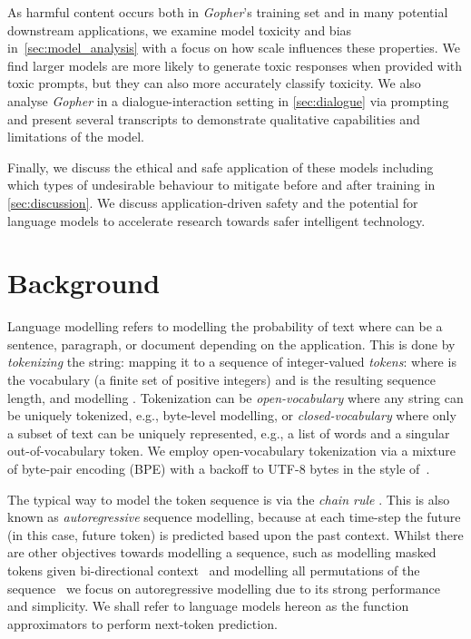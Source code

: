 \documentclass[11pt, a4paper, logo, internal, copyright, nonumbering]{deepmind}
\newcommand{\gopher}{\textit{Gopher}\xspace}
\begin{document}
As harmful content occurs both in \gopher's training set and in many potential downstream applications, we examine model toxicity and bias in~\autoref{sec:model_analysis} with a focus on how scale influences these properties. We find larger models are more likely to generate toxic responses when provided with toxic prompts, but they can also more accurately classify toxicity. 
We also analyse \gopher in a dialogue-interaction setting in \autoref{sec:dialogue} via prompting and present several transcripts to demonstrate qualitative capabilities and limitations of the model.


Finally, we discuss the ethical and safe application of these models including which types of undesirable behaviour to mitigate before and after training in \autoref{sec:discussion}. We discuss application-driven safety and the potential for language models to accelerate research towards safer intelligent technology.


\section{Background}
\label{background}
Language modelling refers to modelling the probability of text  where  can be a sentence, paragraph, or document depending on the application. This is done by \textit{tokenizing} the string: mapping it to a sequence of integer-valued \textit{tokens}:  where  is the vocabulary (a finite set of positive integers) and  is the resulting sequence length, and modelling . Tokenization can be \textit{open-vocabulary} where any string can be uniquely tokenized, e.g., byte-level modelling, or \textit{closed-vocabulary} where only a subset of text can be uniquely represented, e.g., a list of words and a singular out-of-vocabulary token. We employ open-vocabulary tokenization via a mixture of byte-pair encoding (BPE) with a backoff to UTF-8 bytes in the style of~\citet{radford2018improving}. 


The typical way to model the token sequence  is via the \textit{chain rule} . This is also known as \textit{autoregressive} sequence modelling, because at each time-step the future (in this case, future token) is predicted based upon the past context. Whilst there are other objectives towards modelling a sequence, such as modelling masked tokens given bi-directional context~\citep{mikolov2013efficient, devlin2019bert} and modelling all permutations of the sequence~\citep{yang2019xlnet} we focus on autoregressive modelling due to its strong performance and simplicity. We shall refer to language models hereon as the function approximators to perform next-token prediction.
\end{document}
